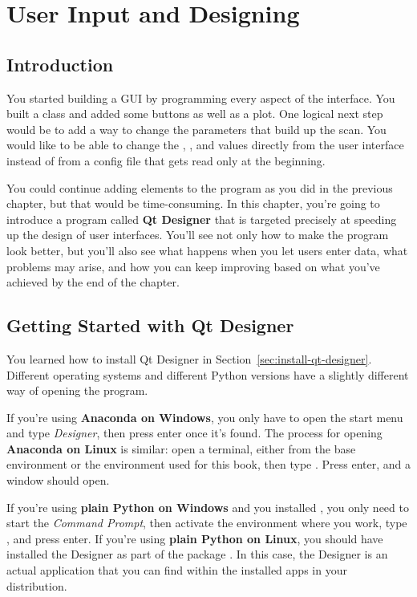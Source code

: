 \chapter{User Input and Designing}\label{ch:user-input-designer}

\section{Introduction}\label{sec:user-input-introduction}
You started building a GUI by programming every aspect of the interface. You built a  class and added some buttons as well as a plot. One logical next step would be to add a way to change the parameters that build up the scan. You would like to be able to change the , , and  values directly from the user interface instead of from a config file that gets read only at the beginning.

You could continue adding elements to the program as you did in the previous chapter, but that would be time-consuming. In this chapter, you're going to introduce a program called \textbf{Qt Designer} that is targeted precisely at speeding up the design of user interfaces. You'll see not only how to make the program look better, but you'll also see what happens when you let users enter data, what problems may arise, and how you can keep improving based on what you've achieved by the end of the chapter.

\section{Getting Started with Qt Designer}\label{sec:getting-started-with-qt-designer}
You learned how to install Qt Designer in Section~\ref{sec:install-qt-designer}. Different operating systems and different Python versions have a slightly different way of opening the program.

If you're using \textbf{Anaconda on Windows}, you only have to open the start menu and type \textit{Designer}, then press \py{}enter once it's found. The process for opening \textbf{Anaconda on Linux} is similar: open a terminal, either from the base environment or the environment used for this book, then type . Press enter, and a window should open.

If you're using \textbf{plain Python on Windows} and you installed , you only need to start the \emph{Command Prompt}, then activate the environment where you work, type , and press enter. If you're using \textbf{plain Python on Linux}, you should have installed the Designer as part of the package . In this case, the Designer is an actual application that you can find within the installed apps in your distribution.

